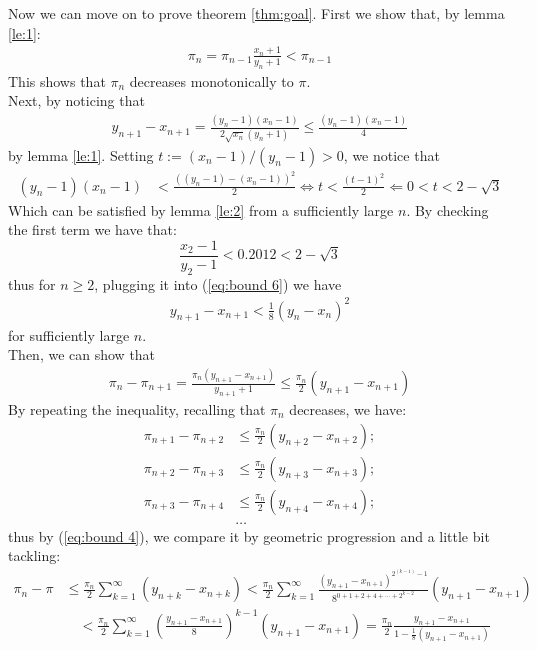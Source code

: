 \documentclass{report}
\begin{document}
\begin{titlepage}
Now we can move on to prove theorem \ref{thm:goal}. First we show that, by lemma \ref{le:1}:
\begin{align*}
\pi_n=\pi_{n-1}\frac{x_n+1}{y_n+1}<\pi_{n-1}
\end{align*}
This shows that $\pi_n$ decreases monotonically to $\pi$. \\
Next, by noticing that
\begin{align}
y_{n+1}-x_{n+1}=\frac{(y_n-1)(x_n-1)}{2\sqrt{x_n}(y_n+1)}\leq\frac{(y_n-1)(x_n-1)}{4}\label {eq:bound 6}
\end{align}
by lemma \ref{le:1}. Setting $t:=(x_n-1)/(y_n-1)>0$, we notice that 
\begin{align*}
(y_n-1)(x_n-1)&<\frac{\left((y_n-1)-(x_n-1)\right)^2}{2}
\Longleftrightarrow t<\frac{(t-1)^2}{2}\Longleftarrow0<t<2-\sqrt3
\end{align*}
Which can be satisfied by lemma \ref{le:2} from a sufficiently large $n$. By checking the first term we have that:
\[
\frac{x_2-1}{y_2-1}<0.2012<2-\sqrt3
\]
thus for $n\ge2$, plugging it into (\ref {eq:bound 6}) we have\cite{Borwein:1987aa}
\begin{align}
y_{n+1}-x_{n+1}<\frac{1}{8}(y_n-x_n)^2
\label {eq:bound 4}
\end{align}
for sufficiently large $n$.\\
Then, we can show that\cite{Borwein:1987aa}
\begin{align}
\pi_{n}-\pi_{n+1}=\frac{\pi_n(y_{n+1}-x_{n+1})}{y_{n+1}+1}\leq\frac{\pi_n}{2}(y_{n+1}-x_{n+1}) \label{eq:bound 5}
\end{align}
By repeating the inequality, recalling that $\pi_n$ decreases, we have:
\begin{align*}
\pi_{n+1}-\pi_{n+2}&\leq\frac{\pi_n}{2}(y_{n+2}-x_{n+2});\\
\pi_{n+2}-\pi_{n+3}&\leq\frac{\pi_n}{2}(y_{n+3}-x_{n+3});\\
\pi_{n+3}-\pi_{n+4}&\leq\frac{\pi_n}{2}(y_{n+4}-x_{n+4});\\
&\ldots
\end{align*}
thus by (\ref{eq:bound 4}), we compare it by geometric progression and a little bit tackling\cite{Borwein:1987aa}:
\begin{align*}
\pi_n-\pi &\leq \frac{\pi_n}{2}\sum_{k=1}^{\infty}(y_{n+k}-x_{n+k})<\frac{\pi_n}{2}\sum_{k=1}^{\infty}\frac{(y_{n+1}-x_{n+1})^{2^{(k-1)}-1}}{8^{0+1+2+4+\cdots+2^{k-2}}}(y_{n+1}-x_{n+1})\\
&\quad<\frac{\pi_n}{2}\sum_{k=1}^{\infty}(\frac{y_{n+1}-x_{n+1}}{8})^{k-1}(y_{n+1}-x_{n+1})=\frac{\pi_n}{2}\frac{y_{n+1}-x_{n+1}}{1-\frac{1}{8}(y_{n+1}-x_{n+1})}

\end{align*}
\end{titlepage}
\end{document}
